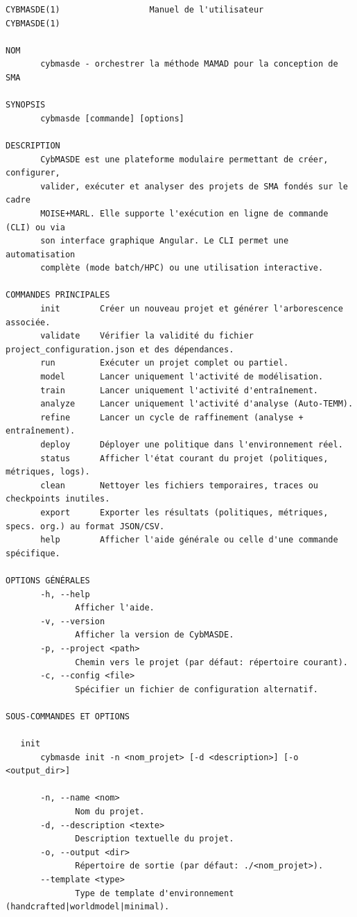 \begin{verbatim}
CYBMASDE(1)                  Manuel de l'utilisateur                  CYBMASDE(1)

NOM
       cybmasde - orchestrer la méthode MAMAD pour la conception de SMA

SYNOPSIS
       cybmasde [commande] [options]

DESCRIPTION
       CybMASDE est une plateforme modulaire permettant de créer, configurer,
       valider, exécuter et analyser des projets de SMA fondés sur le cadre
       MOISE+MARL. Elle supporte l'exécution en ligne de commande (CLI) ou via
       son interface graphique Angular. Le CLI permet une automatisation
       complète (mode batch/HPC) ou une utilisation interactive.

COMMANDES PRINCIPALES
       init        Créer un nouveau projet et générer l'arborescence associée.
       validate    Vérifier la validité du fichier project_configuration.json et des dépendances.
       run         Exécuter un projet complet ou partiel.
       model       Lancer uniquement l'activité de modélisation.
       train       Lancer uniquement l'activité d'entraînement.
       analyze     Lancer uniquement l'activité d'analyse (Auto-TEMM).
       refine      Lancer un cycle de raffinement (analyse + entraînement).
       deploy      Déployer une politique dans l'environnement réel.
       status      Afficher l'état courant du projet (politiques, métriques, logs).
       clean       Nettoyer les fichiers temporaires, traces ou checkpoints inutiles.
       export      Exporter les résultats (politiques, métriques, specs. org.) au format JSON/CSV.
       help        Afficher l'aide générale ou celle d'une commande spécifique.

OPTIONS GÉNÉRALES
       -h, --help
              Afficher l'aide.
       -v, --version
              Afficher la version de CybMASDE.
       -p, --project <path>
              Chemin vers le projet (par défaut: répertoire courant).
       -c, --config <file>
              Spécifier un fichier de configuration alternatif.

SOUS-COMMANDES ET OPTIONS

   init
       cybmasde init -n <nom_projet> [-d <description>] [-o <output_dir>]

       -n, --name <nom>
              Nom du projet.
       -d, --description <texte>
              Description textuelle du projet.
       -o, --output <dir>
              Répertoire de sortie (par défaut: ./<nom_projet>).
       --template <type>
              Type de template d'environnement (handcrafted|worldmodel|minimal).


\end{verbatim}
